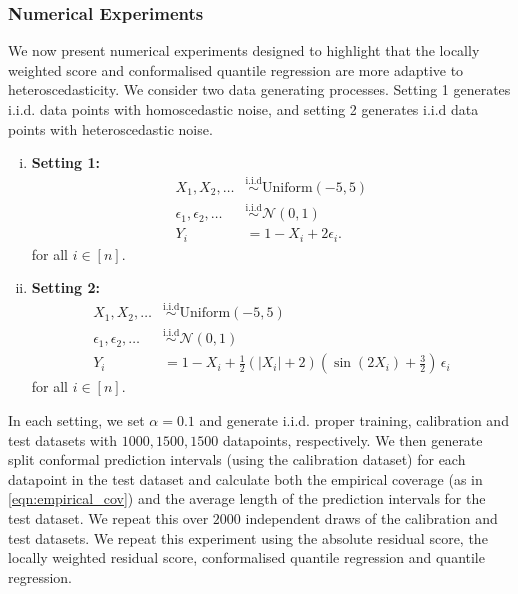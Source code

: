 \documentclass[11pt, titlepage]{article} %
\newcommand{\R}{\mathrm}
\numberwithin{equation}{section}
\theoremstyle{definition}
\numberwithin{theorem}{section}
\numberwithin{lemma}{section}
\numberwithin{corollary}{section}
\numberwithin{proposition}{section}
\numberwithin{definition}{section}
\numberwithin{remark}{section}
\begin{document}
\subsubsection{Numerical Experiments}

We now present numerical experiments designed to highlight that the locally weighted score and conformalised quantile regression are more adaptive to heteroscedasticity. We consider two data generating processes. Setting 1 generates i.i.d. data points with homoscedastic noise, and setting 2 generates i.i.d data points with heteroscedastic noise.
\begin{enumerate}[(i)]
    \item \textbf{Setting 1: } \begin{align*}
        X_1, X_2, \ldots &\overset{\R{i.i.d}}{\sim} \R{Uniform}(-5,5) \\
        \epsilon_1, \epsilon_2, \ldots &\overset{\R{i.i.d}}{\sim} \mathcal{N}(0,1) \\
        Y_i &= 1 - X_i + 2\epsilon_i. 
    \end{align*} for all \(i \in [n]\).
    \item \textbf{Setting 2: } \begin{align*}
        X_1, X_2, \ldots &\overset{\R{i.i.d}}{\sim} \R{Uniform}(-5,5) \\
        \epsilon_1, \epsilon_2, \ldots &\overset{\R{i.i.d}}{\sim} \mathcal{N}(0,1) \\
        Y_i &= 1 - X_i + \frac{1}{2}\left(|X_i| + 2\right)\left(\sin(2X_i) + \frac{3}{2}\right) \, \epsilon_i
    \end{align*} for all \(i \in [n]\).    
\end{enumerate}

\noindent
In each setting, we set \(\alpha = 0.1\) and generate i.i.d. proper training, calibration and test datasets with \(1000, 1500, 1500\) datapoints, respectively. We then generate split conformal prediction intervals (using the calibration dataset) for each datapoint in the test dataset and calculate both the empirical coverage (as in \eqref{eqn:empirical_cov}) and the average length of the prediction intervals for the test dataset. We repeat this over \(2000\) independent draws of the calibration and test datasets. We repeat this experiment using the absolute residual score, the locally weighted residual score, conformalised quantile regression and quantile regression. \vskip5pt
\end{document}
